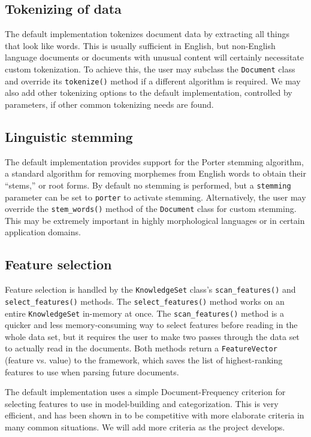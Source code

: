 \documentclass[a4paper,twocolumn]{article}
\begin{document}
\subsection{Tokenizing of data}
The default implementation tokenizes document data by extracting all
things that look like words.  This is usually sufficient in English,
but non-English language documents or documents with unusual content
will certainly necessitate custom tokenization.  To achieve this, the
user may subclass the \texttt{Document} class and override its
\texttt{tokenize()} method if a different algorithm is required.  We
may also add other tokenizing options to the default implementation,
controlled by parameters, if other common tokenizing needs are found.

\subsection{Linguistic stemming}
The default implementation provides support for the Porter stemming
algorithm, a standard algorithm for removing morphemes from English
words to obtain their ``stems,'' or root forms.  By default no
stemming is performed, but a \texttt{stemming} parameter can be set to
\texttt{porter} to activate stemming.  Alternatively, the user may
override the \texttt{stem\_words()} method of the \texttt{Document}
class for custom stemming.  This may be extremely important in highly
morphological languages or in certain application domains.

\subsection{Feature selection}
Feature selection is handled by the \texttt{KnowledgeSet} class's
\texttt{scan\_features()} and \texttt{select\_features()} methods.
The \texttt{select\_features()} method works on an entire
\texttt{KnowledgeSet} in-memory at once.  The
\texttt{scan\_features()} method is a quicker and less
memory-consuming way to select features before reading in the whole
data set, but it requires the user to make two passes through the data
set to actually read in the documents.  Both methods return a
\texttt{FeatureVector} (feature vs. value) to the framework, which
saves the list of highest-ranking features to use when parsing future
documents.

The default implementation uses a simple Document-Frequency criterion
for selecting features to use in model-building and categorization.
This is very efficient, and has been shown in \cite{yang:97} to be
competitive with more elaborate criteria in many common situations.
We will add more criteria as the project develops.
\end{document}
